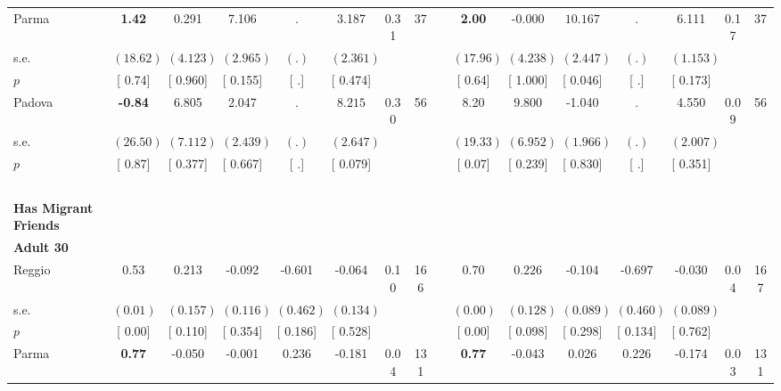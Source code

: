 \begin{longtable}{L{8em} c c c c c c c p{1em} c c c c c c c}
\quad \quad \quad Parma& \textbf{     1.42} &     0.291 &     7.106 &         . &     3.187 &      0.31 &        37 & & \textbf{     2.00} &    -0.000 & $ \mathbf{   10.167}$ &         . &     6.111 &      0.17 &        37  \\*
\quad \quad \quad \quad s.e.& $ (    18.62)$ & $ (    4.123)$ & $ (    2.965)$ & $ (        .)$ & $ (    2.361)$ & & & & $ (    17.96)$ & $ (    4.238)$ & $ (    2.447)$ & $ (        .)$ & $ (    1.153)$ & &  \\*
\quad \quad \quad \quad $ p$ & [     0.74] & [    0.960] & [    0.155] & [        .] & [    0.474] & & & & [     0.64] & [    1.000] & [    0.046] & [        .] & [    0.173] & &  \\[1em]
\quad \quad \quad Padova& \textbf{    -0.84} &     6.805 &     2.047 &         . & $ \mathbf{    8.215}$ &      0.30 &        56 & & 8.20 &     9.800 &    -1.040 &         . &     4.550 &      0.09 &        56  \\*
\quad \quad \quad \quad s.e.& $ (    26.50)$ & $ (    7.112)$ & $ (    2.439)$ & $ (        .)$ & $ (    2.647)$ & & & & $ (    19.33)$ & $ (    6.952)$ & $ (    1.966)$ & $ (        .)$ & $ (    2.007)$ & &  \\*
\quad \quad \quad \quad $ p$ & [     0.87] & [    0.377] & [    0.667] & [        .] & [    0.079] & & & & [     0.07] & [    0.239] & [    0.830] & [        .] & [    0.351] & &  \\[1em]
~\\[1em]
\textbf{Has Migrant Friends} \\*
\quad \quad \textbf{Adult 30} & & & & & & & & & & & & & & & \\* 
\quad \quad \quad Reggio& 0.53 &     0.213 &    -0.092 &    -0.601 &    -0.064 &      0.10 &       166 & & 0.70 & $ \mathbf{    0.226}$ &    -0.104 &    -0.697 &    -0.030 &      0.04 &       167  \\*
\quad \quad \quad \quad s.e.& $ (     0.01)$ & $ (    0.157)$ & $ (    0.116)$ & $ (    0.462)$ & $ (    0.134)$ & & & & $ (     0.00)$ & $ (    0.128)$ & $ (    0.089)$ & $ (    0.460)$ & $ (    0.089)$ & &  \\*
\quad \quad \quad \quad $ p$ & [     0.00] & [    0.110] & [    0.354] & [    0.186] & [    0.528] & & & & [     0.00] & [    0.098] & [    0.298] & [    0.134] & [    0.762] & &  \\[1em]
\quad \quad \quad Parma& \textbf{     0.77} &    -0.050 &    -0.001 &     0.236 &    -0.181 &      0.04 &       131 & & \textbf{     0.77} &    -0.043 &     0.026 &     0.226 &    -0.174 &      0.03 &       131  \\*

\end{longtable}
